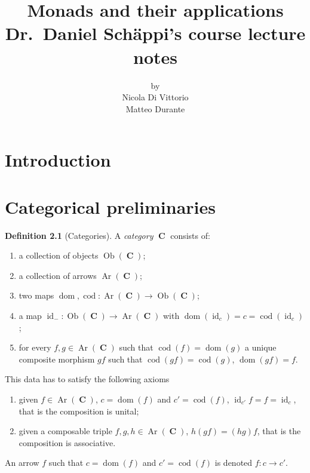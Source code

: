 \documentclass[a4paper,11pt,twoside, openany]{book}
\DeclareMathOperator{\C}{\mathbf{C}}
\DeclareMathOperator{\id}{id}
\DeclareMathOperator{\dom}{dom}
\DeclareMathOperator{\cod}{cod}
\DeclareMathOperator{\Ob}{Ob}
\DeclareMathOperator{\Ar}{Ar}
\theoremstyle{definition}
\theoremstyle{definition}
\newtheorem{defn}[thm]{Definition} %
\theoremstyle{remark}
\begin{document}
	\author{by \\
		Nicola Di Vittorio \\ Matteo Durante}
	\title{\huge Monads and their applications \\
		\vspace*{5mm}
		\large Dr.\ Daniel Schäppi's course lecture notes} 
	\date{}
	
	\frontmatter
	\maketitle
	\thispagestyle{empty}\doclicenseThis
	\tableofcontents
	
	\chapter{Introduction}
	
	\mainmatter
	
	\chapter{Categorical preliminaries}
	\begin{defn}[Categories]
		A \emph{category} $\C$ consists of:
		\begin{enumerate}
			\item a collection of objects $\Ob(\C)$;
			\item a collection of arrows $\Ar(\C)$;
			\item two maps $\dom,\cod\colon\Ar(\C)\rightarrow\Ob(\C)$;
			\item a map $\id_{-}\colon\Ob(\C)\rightarrow\Ar(\C)$ with $\dom(\id_{c})=c=\cod(\id_{c})$;
			\item for every $f,g\in\Ar(\C)$ such that $\cod(f)=\dom(g)$ a unique composite morphism $gf$ such that $\cod(gf)=\cod(g)$, $\dom(gf)=f$.
		\end{enumerate}
		This data has to satisfy the following axioms
		\begin{enumerate}
			\item given $f\in\Ar(\C)$, $c=\dom(f)$ and $c'=\cod(f)$, $\id_{c'}f=f=\id_{c}$, that is the composition is unital;
			\item given a composable triple $f,g,h\in\Ar(\C)$, $h(gf)=(hg)f$, that is the composition is associative.
		\end{enumerate}
		An arrow $f$ such that $c=\dom(f)$ and $c'=\cod(f)$ is denoted $f\colon c\rightarrow c'$.
	\end{defn}
	
\end{document}
